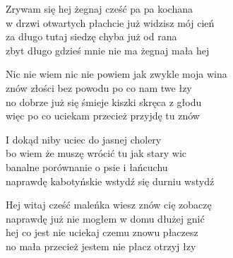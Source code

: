 \begin{text}
    Zrywam się hej żegnaj cześć pa pa kochana\\
    w drzwi otwartych płachcie już widzisz mój cień\\
    za długo tutaj siedzę chyba już od rana\\
    zbyt długo gdzieś mnie nie ma żegnaj mała hej

    Nic nie wiem nic nie powiem jak zwykle moja wina\\
    znów złości bez powodu po co nam twe łzy\\
    no dobrze już się śmieje kiszki skręca z głodu\\
    więc po co uciekam przecież przyjdę tu znów

    I dokąd niby uciec do jasnej cholery\\
    bo wiem że muszę wrócić tu jak stary wic\\
    banalne porównanie o psie i łańcuchu\\
    naprawdę kabotyńskie wstydź się durniu wstydź

    Hej witaj cześć maleńka wiesz znów cię zobaczę\\
    naprawdę już nie mogłem w domu dłużej gnić\\
    hej co jest nie uciekaj czemu znowu płaczesz\\
    no mała przecież jestem nie płacz otrzyj łzy
\end{text}
\begin{chord}

\end{chord}